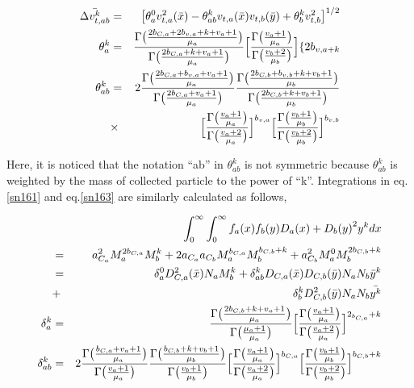 \begin{eqnarray}
\bar{\Delta v_{t,ab}^{k}}&=&\bigl[\theta_{a}^{0}v_{t,a}^{2}(\bar{x})-\theta_{ab}^{k}v_{t,a}(\bar{x})v_{t,b}(\bar{y})+\theta_{b}^{k}v_{t,b}^{2}\bigr]^{1/2}\label{sn170}\\
\theta_{a}^{k}&=&\frac{\Gamma\bigl(\frac{2b_{C,a}+2b_{v,a}+k+v_{a}+1}{\mu_{a}}\bigr)}{\Gamma\bigl(\frac{2b_{C,a}+k+v_{a}+1}{\mu_{a}}\bigr)}\Bigl[\frac{\Gamma\bigl(\frac{v_{a}+1}{\mu_{a}}\bigr)}{\Gamma\bigl(\frac{v_{b}+2}{\mu_{b}}\bigr)}\Bigr]\{2b_{v,a+k}\label{sn171}\\
\theta_{ab}^{k}&=&2\frac{\Gamma\bigl(\frac{2b_{C,a}+b_{v,a}+v_{a}+1}{\mu_{a}}\bigr)}{\Gamma\bigl(\frac{2b_{C,a}+v_{a}+1}{\mu_{a}}\bigr)}\frac{\Gamma\bigl(\frac{2b_{C,b}+b_{v,b}+k+v_{b}+1}{\mu_{b}}\bigr)}{\Gamma\bigl(\frac{2b_{C,b}+k+v_{b}+1}{\mu_{b}}\bigr)}\nonumber\\
&\times&\Bigl[\frac{\Gamma\bigl(\frac{v_{a}+1}{\mu_{a}}\bigr)}{\Gamma\bigl(\frac{v_{a}+2}{\mu_{a}}\bigr)}\Bigr]^{b_{v,a}}\Bigl[\frac{\Gamma\bigl(\frac{v_{b}+1}{\mu_{b}}\bigr)}{\Gamma\bigl(\frac{v_{b}+2}{\mu_{b}}\bigr)}\Bigr]^{b_{v,b}}\label{sn172}
\end{eqnarray}

Here, it is noticed that the notation “ab” in $\theta_{ab}^{k}$ is not symmetric because $\theta_{ab}^{k}$ is weighted by the mass of collected particle to the power of “k”. Integrations in eq.\ref{sn161} and eq.\ref{sn163} are similarly calculated as follows,


\begin{eqnarray}
& &\int_{0}^{\infty}\int_{0}^{\infty}f_{a}(x)f_{b}(y){D_{a}(x)+D_{b}(y)}^{2}y^{k}dx\nonumber\\
&=& a_{C_{a}}^{2}M_{a}^{2b_{C,a}}M_{b}^{k}+2a_{C_{a}}a_{C_{b}}M_{a}^{b_{C,a}}M_{b}^{b_{C,b}+k}+a_{C_{b}}^{2}M_{a}^{0}M_{b}^{2b_{C,b}+k}\nonumber\\
&=& \delta_{a}^{0}D_{C,a}^{2}(\bar{x})N_{a}M_{b}^{k}+\delta_{ab}^{k}D_{C,a}(\bar{x})D_{C,b}(\bar{y})N_{a}N_{b}\bar{y}^{k}\nonumber\\
&+&\delta_{b}^{k}D_{C,b}^{2}(\bar{y})N_{a}N_{b}\bar{y^{k}}\label{sn173}\\
\delta_{a}^{k}&=&\frac{\Gamma\bigl(\frac{2b_{C,b}+k+v_{a}+1}{\mu_{a}}\bigr)}{\Gamma\bigl(\frac{\mu_{a}+1}{\mu_{a}}\bigr)}\Bigl[\frac{\Gamma\bigl(\frac{v_{a}+1}{\mu_{a}}\bigr)}{\Gamma\bigl(\frac{v_{a}+2}{\mu_{a}}\bigr)}\Bigr]^{2_{b_{C,a}}+k}\label{sn174}\\
\delta_{ab}^{k}&=& 2\frac{\Gamma\bigl(\frac{b_{C,a}+v_{a}+1}{\mu_{a}}\bigr)}{\Gamma\bigl(\frac{v_{a}+1}{\mu_{a}}\bigr)}\frac{\Gamma\bigl(\frac{b_{C,b}+k+v_{b}+1}{\mu_{b}}\bigr)}{\Gamma\bigl(\frac{v_{b}+1}{\mu_{b}}\bigr)}\Bigl[\frac{\Gamma\bigl(\frac{v_{a}+1}{\mu_{a}}\bigr)}{\Gamma\bigl(\frac{v_{a}+2}{\mu_{a}}\bigr)}\Bigr]^{b_{C,a}}\Bigl[\frac{\Gamma\bigl(\frac{v_{b}+1}{\mu_{b}}\bigr)}{\Gamma\bigl(\frac{v_{b}+2}{\mu_{b}}\bigr)}\Bigr]^{b_{C,b}+k}\label{sn175}
\end{eqnarray}

